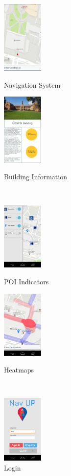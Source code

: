 \documentclass{article}
\begin{document}
{\begin{figure}[h]
\centering
\begin{minipage}{.5\textwidth}
	\centering
	\includegraphics[width=2cm]{Navigation}
	\caption{Navigation System}
\end{minipage}%
\begin{minipage}{.5\textwidth}
	\centering
	\includegraphics[width=2cm]{BuildingInfo}
	\caption{Building Information}
\end{minipage}%
\\
\begin{minipage}{.5\textwidth}
	\centering
	\includegraphics[width=2cm]{MapIcon}
	\caption{POI Indicators}
\end{minipage}%
\begin{minipage}{.5\textwidth}
	\centering
	\includegraphics[width=2cm]{heatmaps}
	\caption{Heatmaps}
\end{minipage}%
\\
\begin{minipage}{.5\textwidth}
	\centering
	\includegraphics[width=2cm]{LogIn}
	\caption{Login}
\end{minipage}%
\end{figure}
}
\end{document}
